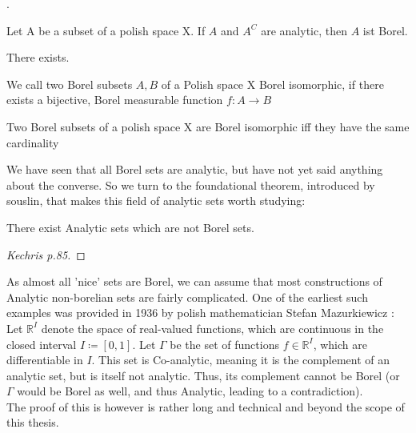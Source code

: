 \documentclass[10pt, a4paper, titlepage]{article}
\numberwithin{equation}{section}
\begin{document}
\begin{theorem}
	.
\end{theorem}


\begin{theorem}
	Let A be a subset of a polish space X. If $A$ and  $A^{C}$ are analytic, then $A$ ist Borel.  
\end{theorem}


\begin{theorem}
	There exists.
\end{theorem}

\begin{definition}
	We call two Borel subsets $A,B$ of a Polish space X Borel isomorphic, if there exists a bijective, Borel measurable function $f: A \to B$
\end{definition}


\begin{theorem}
	Two Borel subsets of a polish space X are Borel isomorphic iff they have the same cardinality
\end{theorem}

We have seen that all Borel sets are analytic, but have not yet said anything about the converse. So we turn to the foundational theorem, introduced by souslin, that makes this field of analytic sets worth studying:
\begin{definition}
	
\end{definition}

\begin{theorem}[Souslin]
	There exist Analytic sets which are not Borel sets. 
\end{theorem}
\begin{proof}
	[Kechris p.85]
\end{proof}



\begin{example}
	As almost all 'nice' sets are Borel, we can assume that most constructions of Analytic non-borelian sets are fairly complicated. 
	One of the earliest such examples was provided in 1936 by polish mathematician Stefan Mazurkiewicz \cite{mazurkiewicz1936}:\\
	Let $\mathbb{R}^I$ denote the space of real-valued functions, which are continuous in the closed interval $I \coloneq[0,1]$. Let  $\Gamma$ be the set of functions  $f \in \mathbb{R}^I$, which are differentiable in $I$. This set is Co-analytic, meaning it is the complement of an analytic set, but is itself not analytic. 
	Thus, its complement cannot be Borel (or $\Gamma$ would be Borel as well, and thus Analytic, leading to a contradiction). \\
	The proof of this is however is rather long and technical and beyond the scope of this thesis.
	
\end{example}
\end{document}
